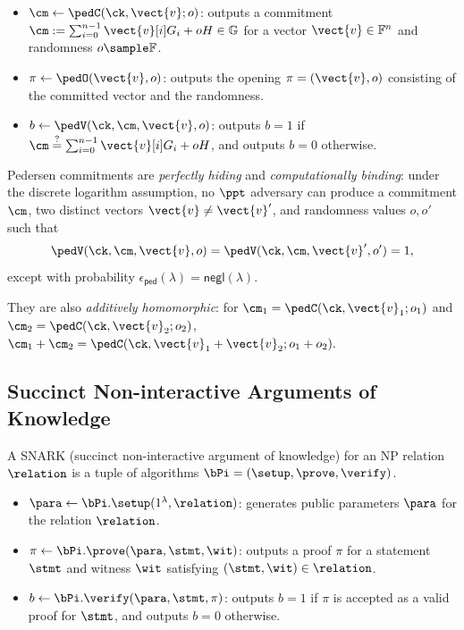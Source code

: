 \begin{itemize}
\item $\cm \gets \pedC(\ck,\vect{v};o)$:
outputs a commitment $\cm := \sum_{i=0}^{n-1}\vect{v}[i]G_i + oH \in \mathbb{G}$ for a vector $\vect{v}\in\mathbb{F}^n$ and randomness $o\sample\mathbb{F}$.

\item $\pi \gets \pedO(\vect{v},o)$:
outputs the opening $\pi=(\vect{v},o)$ consisting of the committed vector and the randomness.

\item $b \gets \pedV(\ck,\cm,\vect{v},o)$:
outputs $b=1$ if $\cm \stackrel{?}{=} \sum_{i=0}^{n-1}\vect{v}[i]G_i + oH$,
and outputs $b=0$ otherwise.
\end{itemize}

Pedersen commitments are \emph{perfectly hiding} and
\emph{computationally binding}: under the discrete logarithm assumption,
no $\ppt$ adversary can produce a commitment $\cm$, two distinct vectors
$\vect{v}\neq\vect{v}'$, and randomness values $o,o'$ such that
\[
\pedV(\ck,\cm,\vect{v},o) = \pedV(\ck,\cm,\vect{v}',o') = 1,
\]
except with probability
$\epsilon_{\mathsf{ped}}(\lambda)=\mathsf{negl}(\lambda)$.

They are also \emph{additively homomorphic}: for
$\cm_1=\pedC(\ck,\vect{v}_1;o_1)$ and
$\cm_2=\pedC(\ck,\vect{v}_2;o_2)$, $\cm_1+\cm_2 = \pedC(\ck,\vect{v}_1+\vect{v}_2;o_1+o_2).$


\subsection{Succinct Non-interactive Arguments of Knowledge}
\label{sec:prelim-snark}

A SNARK (succinct non-interactive argument of knowledge) for an NP relation
$\relation$ is a tuple of algorithms $\bPi=(\setup,\prove,\verify)$.

\begin{itemize}
\item $\para \gets \bPi.\setup(1^\lambda,\relation)$:
generates public parameters $\para$ for the relation $\relation$.

\item $\pi \gets \bPi.\prove(\para,\stmt,\wit)$:
outputs a proof $\pi$ for a statement $\stmt$ and witness $\wit$ satisfying $(\stmt,\wit)\in\relation$.

\item $b \gets \bPi.\verify(\para,\stmt,\pi)$:
outputs $b=1$ if $\pi$ is accepted as a valid proof for $\stmt$, and outputs $b=0$ otherwise.
\end{itemize}

